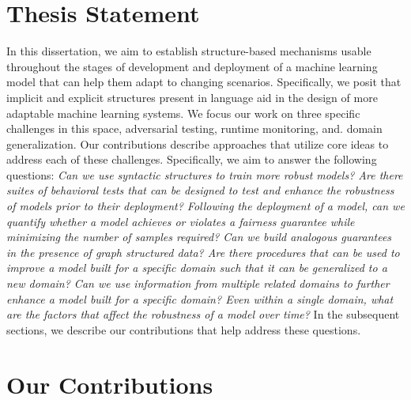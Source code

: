 \section{Thesis Statement}
In this dissertation, we aim to establish structure-based mechanisms usable throughout the stages of development and deployment of a machine learning model that can help them adapt to changing scenarios. 
Specifically, we posit that implicit and explicit structures present in language aid in the design of more adaptable machine learning systems.
We focus our work on three specific challenges in this space, adversarial testing, runtime monitoring, and. domain generalization.
Our contributions describe approaches that utilize core ideas to address each of these challenges.
Specifically, we aim to answer the following questions: 
\emph{Can we use syntactic structures to train more robust models?
Are there suites of behavioral tests that can be designed to test and enhance the robustness of models prior to their deployment?
Following the deployment of a model, can we quantify whether a model achieves or violates a fairness guarantee while minimizing the number of samples required?
Can we build analogous guarantees in the presence of graph structured data?
Are there procedures that can be used to improve a model built for a specific domain such that it can be generalized to a new domain?
Can we use information from multiple related domains to further enhance a model built for a specific domain?
Even within a single domain, what are the factors that affect the robustness of a model over time?}
In the subsequent sections, we describe our contributions that help address these questions.

\section{Our Contributions}

